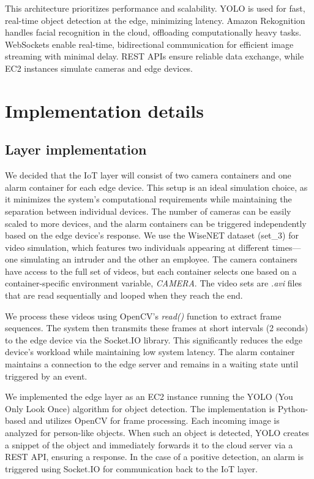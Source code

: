 \documentclass[conference]{IEEEtran}
\begin{document}
This architecture prioritizes performance and scalability. YOLO is used for fast, real-time object detection at the edge, minimizing latency. Amazon Rekognition handles facial recognition in the cloud, offloading computationally heavy tasks. WebSockets enable real-time, bidirectional communication for efficient image streaming with minimal delay. REST APIs ensure reliable data exchange, while EC2 instances simulate cameras and edge devices. 

\section{Implementation details}


\subsection{Layer implementation}
We decided that the IoT layer will consist of two camera containers and one alarm container for each edge device. This setup is an ideal simulation choice, as it minimizes the system’s computational requirements while maintaining the separation between individual devices. The number of cameras can be easily scaled to more devices, and the alarm containers can be triggered independently based on the edge device's response.
We use the WiseNET dataset (set\_3) for video simulation, which features two individuals appearing at different times—one simulating an intruder and the other an employee. The camera containers have access to the full set of videos, but each container selects one based on a container-specific environment variable, \textit{CAMERA}. The video sets are \textit{.avi} files that are read sequentially and looped when they reach the end.

We process these videos using OpenCV's \textit{read()} function to extract frame sequences. The system then transmits these frames at short intervals (2 seconds) to the edge device via the Socket.IO library. This significantly reduces the edge device's workload while maintaining low system latency. The alarm container maintains a connection to the edge server and remains in a waiting state until triggered by an event.\hfill \break

We implemented the edge layer as an EC2 instance running the YOLO (You Only Look Once) algorithm for object detection. The implementation is Python-based and utilizes OpenCV for frame processing. Each incoming image is analyzed for person-like objects. When such an object is detected, YOLO creates a snippet of the object and immediately forwards it to the cloud server via a REST API, ensuring a response. In the case of a positive detection, an alarm is triggered using Socket.IO for communication back to the IoT layer.\hfill \break
\end{document}
